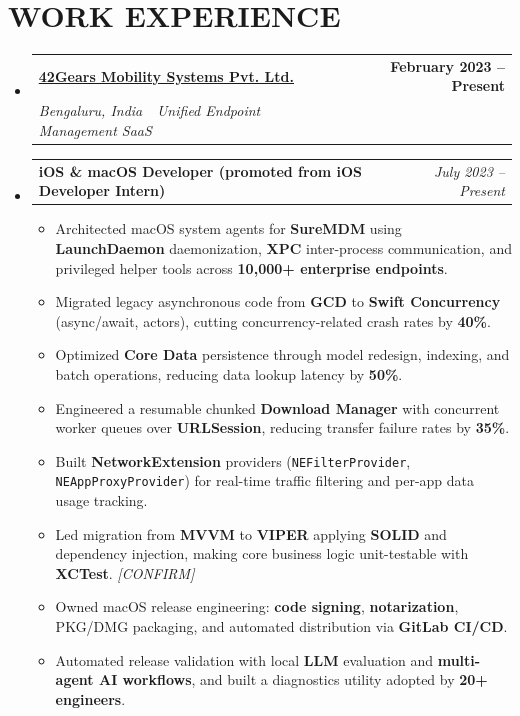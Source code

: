 \documentclass[letterpaper,10pt]{article}
\makeatletter
\newcommand{\resumeItem}[1]{\item\small{{#1 \vspace{-3pt}}}}
\newcommand{\resumeCompany}[3]{
  \vspace{-2pt}\item
    \begin{tabular*}{1.0\textwidth}[t]{l@{\extracolsep{\fill}}r}
      \textbf{\large#1} & \textbf{\small #3} \\
      \textit{\small#2} & \\
    \end{tabular*}\vspace{-7pt}
}
\newcommand{\resumeRole}[2]{
    \item
    \begin{tabular*}{0.97\textwidth}{l@{\extracolsep{\fill}}r}
      \textbf{\small#1} & \textit{\small #2} \\
    \end{tabular*}\vspace{-7pt}
}
\newcommand{\resumeSubHeadingListStart}{\begin{itemize}[leftmargin=0.0in, label={}]}
\newcommand{\resumeSubHeadingListEnd}{\end{itemize}}
\newcommand{\resumeItemListStart}{\begin{itemize}}
\newcommand{\resumeItemListEnd}{\end{itemize}\vspace{-6pt}}
\makeatother
\begin{document}
\section{WORK EXPERIENCE}
    \resumeSubHeadingListStart
        \resumeCompany
          {\href{https://www.42gears.com/}{42Gears Mobility Systems Pvt. Ltd.}}
          {Bengaluru, India \,\textbar\, Unified Endpoint Management SaaS}
          {February 2023 -- Present}
        \resumeRole{iOS \& macOS Developer \textnormal{(promoted from iOS Developer Intern)}}{July 2023 -- Present}
            \resumeItemListStart
                \resumeItem{Architected macOS system agents for \textbf{SureMDM} using \textbf{LaunchDaemon} daemonization, \textbf{XPC} inter-process communication, and privileged helper tools across \textbf{10,000+ enterprise endpoints}.}
                \resumeItem{Migrated legacy asynchronous code from \textbf{GCD} to \textbf{Swift Concurrency} (async/await, actors), cutting concurrency-related crash rates by \textbf{40\%}.}
                \resumeItem{Optimized \textbf{Core Data} persistence through model redesign, indexing, and batch operations, reducing data lookup latency by \textbf{50\%}.}
                \resumeItem{Engineered a resumable chunked \textbf{Download Manager} with concurrent worker queues over \textbf{URLSession}, reducing transfer failure rates by \textbf{35\%}.}
                \resumeItem{Built \textbf{NetworkExtension} providers (\texttt{NEFilterProvider}, \texttt{NEAppProxyProvider}) for real-time traffic filtering and per-app data usage tracking.}
                \resumeItem{Led migration from \textbf{MVVM} to \textbf{VIPER} applying \textbf{SOLID} and dependency injection, making core business logic unit-testable with \textbf{XCTest}. \textit{[CONFIRM]}}
                \resumeItem{Owned macOS release engineering: \textbf{code signing}, \textbf{notarization}, PKG/DMG packaging, and automated distribution via \textbf{GitLab CI/CD}.}
                \resumeItem{Automated release validation with local \textbf{LLM} evaluation and \textbf{multi-agent AI workflows}, and built a diagnostics utility adopted by \textbf{20+ engineers}.}
            \resumeItemListEnd
    \resumeSubHeadingListEnd

\vspace{-7pt}
\end{document}
